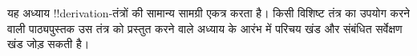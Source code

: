 \documentclass[../../../include/open-logic-chapter]{subfiles}
\begin{document}
      {}
      {}

\begin{editorial}
यह अध्याय !!{derivation}-तंत्रों की सामान्य सामग्री एकत्र करता है। किसी
विशिष्ट तंत्र का उपयोग करने वाली पाठ्यपुस्तक उस तंत्र को प्रस्तुत करने वाले
अध्याय के आरंभ में परिचय खंड और संबंधित सर्वेक्षण खंड जोड़ सकती है।
\end{editorial}






\OLEndChapterHook
\end{document}
